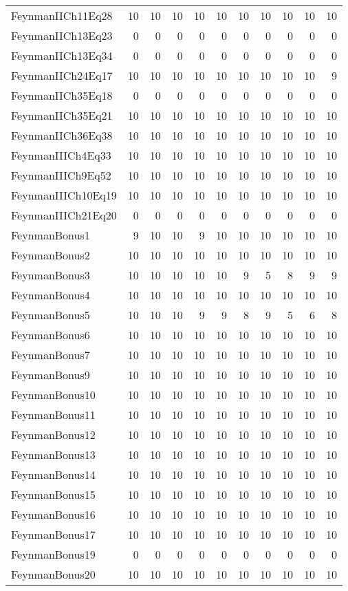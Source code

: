 \begin{tabular}{lrrrrrrrrrr}
FeynmanIICh11Eq28 & 10 & 10 & 10 & 10 & 10 & 10 & 10 & 10 & 10 & 10 \\
FeynmanIICh13Eq23 & 0 & 0 & 0 & 0 & 0 & 0 & 0 & 0 & 0 & 0 \\
FeynmanIICh13Eq34 & 0 & 0 & 0 & 0 & 0 & 0 & 0 & 0 & 0 & 0 \\
FeynmanIICh24Eq17 & 10 & 10 & 10 & 10 & 10 & 10 & 10 & 10 & 10 & 9 \\
FeynmanIICh35Eq18 & 0 & 0 & 0 & 0 & 0 & 0 & 0 & 0 & 0 & 0 \\
FeynmanIICh35Eq21 & 10 & 10 & 10 & 10 & 10 & 10 & 10 & 10 & 10 & 10 \\
FeynmanIICh36Eq38 & 10 & 10 & 10 & 10 & 10 & 10 & 10 & 10 & 10 & 10 \\
FeynmanIIICh4Eq33 & 10 & 10 & 10 & 10 & 10 & 10 & 10 & 10 & 10 & 10 \\
FeynmanIIICh9Eq52 & 10 & 10 & 10 & 10 & 10 & 10 & 10 & 10 & 10 & 10 \\
FeynmanIIICh10Eq19 & 10 & 10 & 10 & 10 & 10 & 10 & 10 & 10 & 10 & 10 \\
FeynmanIIICh21Eq20 & 0 & 0 & 0 & 0 & 0 & 0 & 0 & 0 & 0 & 0 \\
FeynmanBonus1 & 9 & 10 & 10 & 9 & 10 & 10 & 10 & 10 & 10 & 10 \\
FeynmanBonus2 & 10 & 10 & 10 & 10 & 10 & 10 & 10 & 10 & 10 & 10 \\
FeynmanBonus3 & 10 & 10 & 10 & 10 & 10 & 9 & 5 & 8 & 9 & 9 \\
FeynmanBonus4 & 10 & 10 & 10 & 10 & 10 & 10 & 10 & 10 & 10 & 10 \\
FeynmanBonus5 & 10 & 10 & 10 & 9 & 9 & 8 & 9 & 5 & 6 & 8 \\
FeynmanBonus6 & 10 & 10 & 10 & 10 & 10 & 10 & 10 & 10 & 10 & 10 \\
FeynmanBonus7 & 10 & 10 & 10 & 10 & 10 & 10 & 10 & 10 & 10 & 10 \\
FeynmanBonus9 & 10 & 10 & 10 & 10 & 10 & 10 & 10 & 10 & 10 & 10 \\
FeynmanBonus10 & 10 & 10 & 10 & 10 & 10 & 10 & 10 & 10 & 10 & 10 \\
FeynmanBonus11 & 10 & 10 & 10 & 10 & 10 & 10 & 10 & 10 & 10 & 10 \\
FeynmanBonus12 & 10 & 10 & 10 & 10 & 10 & 10 & 10 & 10 & 10 & 10 \\
FeynmanBonus13 & 10 & 10 & 10 & 10 & 10 & 10 & 10 & 10 & 10 & 10 \\
FeynmanBonus14 & 10 & 10 & 10 & 10 & 10 & 10 & 10 & 10 & 10 & 10 \\
FeynmanBonus15 & 10 & 10 & 10 & 10 & 10 & 10 & 10 & 10 & 10 & 10 \\
FeynmanBonus16 & 10 & 10 & 10 & 10 & 10 & 10 & 10 & 10 & 10 & 10 \\
FeynmanBonus17 & 10 & 10 & 10 & 10 & 10 & 10 & 10 & 10 & 10 & 10 \\
FeynmanBonus19 & 0 & 0 & 0 & 0 & 0 & 0 & 0 & 0 & 0 & 0 \\
FeynmanBonus20 & 10 & 10 & 10 & 10 & 10 & 10 & 10 & 10 & 10 & 10 \\
\bottomrule
\end{tabular}
